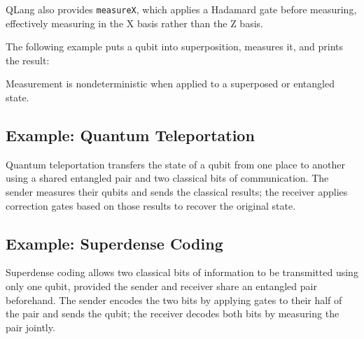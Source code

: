QLang also provides \texttt{measureX}, which applies a Hadamard gate before
measuring, effectively measuring in the X basis rather than the Z basis.

The following example puts a qubit into superposition, measures it, and
prints the result:



Measurement is nondeterministic when applied to a superposed or entangled
state.

\subsection{Example: Quantum Teleportation}
\label{sec:teleportation}

Quantum teleportation transfers the state of a qubit from one place to
another using a shared entangled pair and two classical bits of
communication. The sender measures their qubits and sends the classical
results; the receiver applies correction gates based on those results to
recover the original state.



\subsection{Example: Superdense Coding}
\label{sec:superdense}

Superdense coding allows two classical bits of information to be
transmitted using only one qubit, provided the sender and receiver share
an entangled pair beforehand. The sender encodes the two bits by applying
gates to their half of the pair and sends the qubit; the receiver decodes
both bits by measuring the pair jointly.



